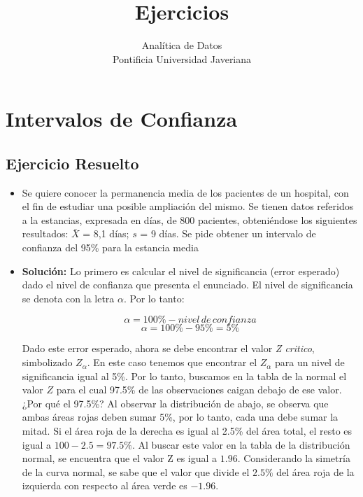 \documentclass[letterpaper]{article}
\begin{document}
\title{{\bf Ejercicios}} 
\author{Analítica de Datos  \\
	Pontificia Universidad Javeriana}

\date{}

\maketitle

\section{Intervalos de Confianza}

\subsection{Ejercicio Resuelto}
\begin{itemize}
	\item Se quiere conocer la permanencia media de los pacientes de un hospital, con el fin de estudiar una posible ampliación del mismo. Se tienen datos referidos a la estancias, expresada en días, de 800 pacientes, obteniéndose los siguientes resultados: $\bar{X}$ = 8,1 días; $s$ = 9 días. Se
	pide obtener un intervalo de confianza del 95\% para la estancia media
	
	
	\item {\bf Solución:} Lo primero es calcular el nivel de significancia (error esperado) dado el nivel de confianza que presenta el enunciado. El nivel de significancia se denota con la letra $\alpha$. Por lo tanto:
	
	$$\alpha=100\% - nivel \, de\, confianza$$
	$$\alpha=100\%-95\%=5\%$$
	
	Dado este error esperado, ahora se debe encontrar el valor \emph{Z critico}, simbolizado $Z_{\alpha}$. En este caso tenemos que encontrar el $Z_{\alpha}$ para un nivel de significancia igual al 5\%. Por lo tanto, buscamos en la tabla de la normal el valor $Z$ para el cual 97.5\% de las observaciones caigan debajo de ese valor. ¿Por qué el 97.5\%? Al observar la distribución de abajo, se observa que ambas áreas rojas deben sumar 5\%, por lo tanto, cada una debe sumar la mitad. Si el área roja de la derecha es igual al 2.5\% del área total, el resto es igual a $100-2.5=97.5\%$. Al buscar este valor en la tabla de la distribución normal, se encuentra que el valor Z es igual a $1.96$. Considerando la simetría de la curva normal, se sabe que el valor que divide el $2.5\%$ del área roja de la izquierda con respecto al área verde es $-1.96$.
	

\end{itemize}
\end{document}
